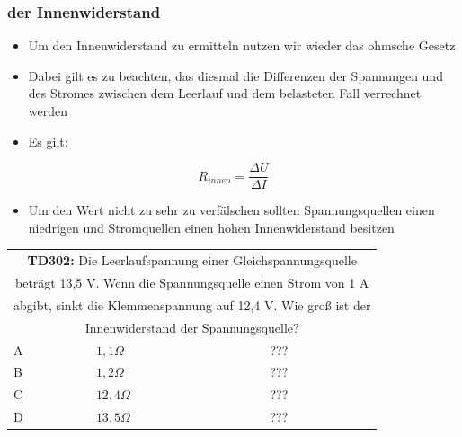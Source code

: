 \begin{frame}
	\frametitle{der Innenwiderstand}
	\begin{itemize}
		\item	Um den Innenwiderstand zu ermitteln nutzen wir wieder das ohmsche Gesetz
		\item	Dabei gilt es zu beachten, das diesmal die Differenzen der Spannungen und des Stromes zwischen dem Leerlauf und dem belasteten Fall verrechnet werden
		\item	Es gilt:
	\end{itemize}
	\begin{equation}
		R_{innen} = \frac{\Delta U}{\Delta I}
	\end{equation}
	\begin{itemize}
		\item	Um den Wert nicht zu sehr zu verfälschen sollten Spannungsquellen einen niedrigen und Stromquellen einen hohen Innenwiderstand besitzen
	\end{itemize}
\end{frame}

\begin{frame}
	\begin{small}	
	\begin{tabular}{|l|l|l|}
	\hline
		\multicolumn{3}{|c|}{\textbf{TD302:} Die Leerlaufspannung einer Gleichspannungsquelle}\\
		\multicolumn{3}{|c|}{beträgt 13,5 V. Wenn die Spannungsquelle einen Strom von 1 A}\\
		\multicolumn{3}{|c|}{abgibt, sinkt die Klemmenspannung auf 12,4 V. Wie groß ist der}\\			\multicolumn{3}{|c|}{Innenwiderstand der Spannungsquelle?}\\
		\hline
		A & $1,1 \Omega$ & ??? \\ \hline
		B & $1,2 \Omega$ & ??? \\ \hline
		C & $12,4 \Omega$ & ??? \\ \hline
		D & $13,5 \Omega$ & ??? \\ \hline 		
	\end{tabular}
	\end{small}
\end{frame}

